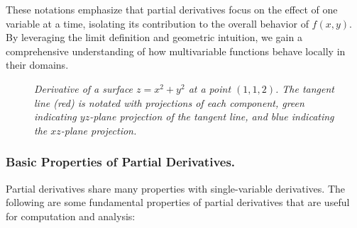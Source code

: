 \noindent These notations emphasize that partial derivatives focus on the effect of one variable at a time, isolating its contribution to the overall behavior of \( f(x, y) \). By leveraging the limit definition and geometric intuition, we gain a comprehensive understanding of how multivariable functions behave locally in their domains.


\begin{figure}[H]
    \centering
{}
 \caption{\textit{Derivative of a surface $z = x^2 + y^2$ at a point $(1,1,2)$. The tangent line (red) is notated with projections of each component, green indicating $yz$-plane projection of the tangent line, and blue indicating the $xz$-plane projection.}}
 \label{fig:derivative_high_order}
\end{figure}


\subsubsection*{Basic Properties of Partial Derivatives.}
Partial derivatives share many properties with single-variable derivatives. The following are some fundamental properties of partial derivatives that are useful for computation and analysis:

